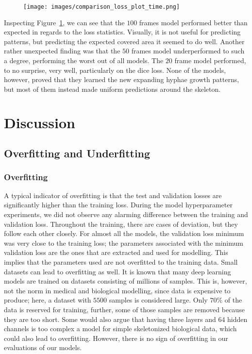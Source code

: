 \documentclass[a4paper,12pt]{article}
\begin{document}
\begin{figure}[H]
\centering
\texttt{[image: images/comparison\_loss\_plot\_time.png]}
\caption{} %
\label{fig:n28}
\end{figure}
Inspecting Figure~\ref{fig:n28}, we can see that the $100$ frames model performed better than expected in regards to the loss statistics. Visually, it is not useful for predicting patterns, but predicting the expected covered area it seemed to do well. Another rather unexpected finding was that the $50$ frames model underperformed to such a degree, performing the worst out of all models. The $20$ frame model performed, to no surprise, very well, particularly on the dice loss. None of the models, however, proved that they learned the new expanding hyphae growth patterns, but most of them instead made uniform predictions around the skeleton.


\section{Discussion}

\subsection{Overfitting and Underfitting}
\subsubsection{Overfitting}
A typical indicator of overfitting is that the test and validation losses are significantly higher than the training loss. During the model hyperparameter experiments, we did not observe any alarming difference between the training and validation loss. Throughout the training, there are cases of deviation, but they follow each other closely.
For almost all the models, the validation loss minimum was very close to the training loss; the parameters associated with the minimum validation loss are the ones that are extracted and used for modelling. This implies that the parameters used are not overfitted to the training data.
Small datasets can lead to overfitting as well. It is known that many deep learning models are trained on datasets consisting of millions of samples. This is, however, not the norm in medical and biological modelling, since data is expensive to produce; here, a dataset with $5500$ samples is considered large. Only $70\%$ of the data is reserved for training, further, some of those samples are removed because they are too short.
Some would also argue that having three layers and 64 hidden channels is too complex a model for simple skeletonized biological data, which could also lead to overfitting. However, there is no sign of overfitting in our evaluations of our models.
\end{document}
